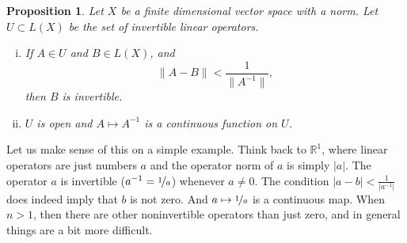 \documentclass[12pt]{book}
\newcommand{\snorm}[1]{\lVert {#1} \rVert}
\newcommand{\abs}[1]{\left\lvert {#1} \right\rvert}
\newcommand{\R}{{\mathbb{R}}}
\theoremstyle{plain}
\newtheorem{prop}[thm]{Proposition}
\theoremstyle{remark}
\theoremstyle{definition}
\theoremstyle{exercise}
\theoremstyle{example}
\begin{document}
\begin{prop} \label{prop:finitedimpropinv}
Let $X$ be a finite dimensional vector space with a norm.
Let $U \subset L(X)$ be the set of invertible linear operators.
\begin{enumerate}[(i)]
\item \label{finitedimpropinv:i}
If $A \in U$ and $B \in L(X)$, and
\begin{equation} \label{eqcontineq}
\snorm{A-B} <  \frac{1}{\snorm{A^{-1}}},
\end{equation}
then $B$ is invertible.
\item \label{finitedimpropinv:ii}
$U$ is open and $A \mapsto A^{-1}$ is a continuous
function on $U$.
\end{enumerate}
\end{prop}


Let us make sense of this on a simple example.
Think back to $\R^1$, where linear operators are just
numbers $a$ and the operator norm of $a$ is simply $\abs{a}$.
The operator $a$ is invertible ($a^{-1} = \nicefrac{1}{a}$)
whenever $a \not=0$.  The condition $\abs{a-b} < \frac{1}{\abs{a^{-1}}}$ does
indeed imply that $b$ is not zero.  And $a \mapsto \nicefrac{1}{a}$ is a continuous
map.
When $n > 1$, then there are other noninvertible operators than just zero,
and in general things are a bit more difficult.
\end{document}
